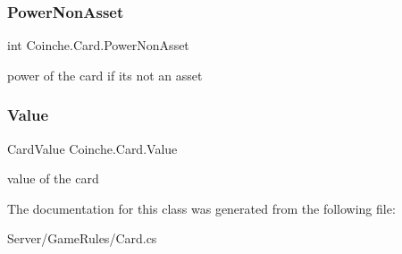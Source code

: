 \mbox{\label{class_coinche_1_1_card_a1bdf34d04e55d97bcf2163b811c78dd3}} 
\subsubsection{\texorpdfstring{Power\+Non\+Asset}{PowerNonAsset}}
{\footnotesize\ttfamily int Coinche.\+Card.\+Power\+Non\+Asset\hspace{0.3cm}{\ttfamily [get]}}



power of the card if it\textquotesingle{}s not an asset 

\mbox{\label{class_coinche_1_1_card_a78224b5558f9f9bbd4036be50f4da865}} 
\subsubsection{\texorpdfstring{Value}{Value}}
{\footnotesize\ttfamily Card\+Value Coinche.\+Card.\+Value\hspace{0.3cm}{\ttfamily [get]}}



value of the card 



The documentation for this class was generated from the following file\+:\begin{DoxyCompactItemize}
\item 
Server/\+Game\+Rules/Card.\+cs\end{DoxyCompactItemize}
